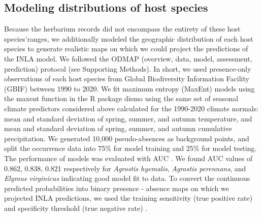 \documentclass[11pt]{article}
\newcommand{\tom}[2]{{\color{red}{#1}}\footnote{\textit{\color{red}{#2}}}}
\newcommand{\josh}[2]{{\color{orange}{#1}}\footnote{\textit{\color{orange}{#2}}}}
\begin{document}


\subsection*{Modeling distributions of host species}
Because the herbarium records did not encompass the entirety of these host species'ranges, we additionally modeled the geographic distribution of each host species to generate realistic maps on which we could project the predictions of the INLA model.
We followed the ODMAP (overview, data, model, assessment, prediction) protocol \citep{crossley2022opposing} (see Supporting Methods). 
In short, we used presence-only observations of each host species from Global Biodiversity Information Facility (GBIF) between 1990 to 2020.
We fit maximum entropy (MaxEnt) models using the maxent function in the R package dismo \citep{hijmans2017package} using the same set of seasonal climate predictors considered above calculated for the 1990-2020 climate normals: mean and standard deviation of spring, summer, and autumn temperature, and mean and standard deviation of spring, summer, and autumn cumulative precipitation.
We generated 10,000 pseudo-absences as background points, and split the occurrence data into 75\% for model training and 25\% for model testing.
The performance of models was evaluated with AUC \citep{jimenez2012insights}. 
We found AUC values of 0.862, 0.838, 0.821 respectively  for \emph{Agrostis hyemalis}, \emph{Agrostis perennans}, and \emph{Elymus virginicus} indicating good model fit to data.
To convert the continuous predicted probabilities into binary presence - absence maps on which we projected INLA predictions, we used the  training sensitivity (true positive rate) and specificity threshold (true negative rate) \citep{liu2005selecting}. 
\end{document}
